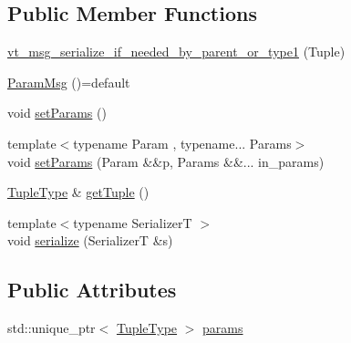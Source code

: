 \subsection*{Public Member Functions}
\begin{DoxyCompactItemize}
\item 
\hyperlink{structvt_1_1messaging_1_1_param_msg_3_01_tuple_00_01std_1_1enable__if__t_3_01not_01is__byte__copae27aaaf2bf1aaed1864cee3aebbc774_af6a20d70b8e4a2fbc8b0de42612dd8d6}{vt\+\_\+msg\+\_\+serialize\+\_\+if\+\_\+needed\+\_\+by\+\_\+parent\+\_\+or\+\_\+type1} (Tuple)
\item 
\hyperlink{structvt_1_1messaging_1_1_param_msg_3_01_tuple_00_01std_1_1enable__if__t_3_01not_01is__byte__copae27aaaf2bf1aaed1864cee3aebbc774_ab09a04140f07bf5b72c6f82cbcae8f9b}{Param\+Msg} ()=default
\item 
void \hyperlink{structvt_1_1messaging_1_1_param_msg_3_01_tuple_00_01std_1_1enable__if__t_3_01not_01is__byte__copae27aaaf2bf1aaed1864cee3aebbc774_ac94c24c043d69101319252235d7eafb9}{set\+Params} ()
\item 
{\footnotesize template$<$typename Param , typename... Params$>$ }\\void \hyperlink{structvt_1_1messaging_1_1_param_msg_3_01_tuple_00_01std_1_1enable__if__t_3_01not_01is__byte__copae27aaaf2bf1aaed1864cee3aebbc774_ac874cc2847c71bffec650269e248b45b}{set\+Params} (Param \&\&p, Params \&\&... in\+\_\+params)
\item 
\hyperlink{structvt_1_1messaging_1_1_param_msg_3_01_tuple_00_01std_1_1enable__if__t_3_01not_01is__byte__copae27aaaf2bf1aaed1864cee3aebbc774_a63c0c672da0bf7b284da9647aad497f8}{Tuple\+Type} \& \hyperlink{structvt_1_1messaging_1_1_param_msg_3_01_tuple_00_01std_1_1enable__if__t_3_01not_01is__byte__copae27aaaf2bf1aaed1864cee3aebbc774_acc98e81baad8e288db26a6bdb944a4e7}{get\+Tuple} ()
\item 
{\footnotesize template$<$typename SerializerT $>$ }\\void \hyperlink{structvt_1_1messaging_1_1_param_msg_3_01_tuple_00_01std_1_1enable__if__t_3_01not_01is__byte__copae27aaaf2bf1aaed1864cee3aebbc774_a29827e82e34aa1666e2bb5a70076c40b}{serialize} (SerializerT \&s)
\end{DoxyCompactItemize}
\subsection*{Public Attributes}
\begin{DoxyCompactItemize}
\item 
std\+::unique\+\_\+ptr$<$ \hyperlink{structvt_1_1messaging_1_1_param_msg_3_01_tuple_00_01std_1_1enable__if__t_3_01not_01is__byte__copae27aaaf2bf1aaed1864cee3aebbc774_a63c0c672da0bf7b284da9647aad497f8}{Tuple\+Type} $>$ \hyperlink{structvt_1_1messaging_1_1_param_msg_3_01_tuple_00_01std_1_1enable__if__t_3_01not_01is__byte__copae27aaaf2bf1aaed1864cee3aebbc774_a0bed46ca731b6d0b81abee26ae3f73a0}{params}
\end{DoxyCompactItemize}
